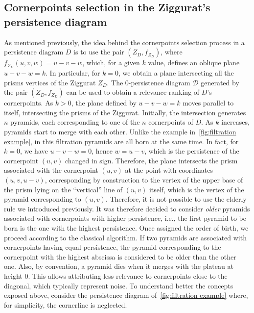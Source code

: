 \documentclass[english, LaM, oneside, noexaminfo]{sapthesis}
\begin{document}
\subsection{Cornerpoints selection in the Ziggurat's persistence diagram}\label{Ziggurat selection}


As mentioned previously, the idea behind the cornerpoints selection process in a persistence diagram $D$ is to use the pair $(Z_{D}, f_ {Z_D})$, where $f_{Z_D}(u, v, w) = u - v - w$, which, for a given $k$ value, defines an oblique plane $u - v - w = k$. In particular, for $k = 0$, we obtain a plane intersecting all the prisms vertices of the Ziggurat $Z_D$. The $0$-persistence diagram $\mathcal{D}$ generated by the pair $(Z_D, f_{Z_D})$ can be used to obtain a relevance ranking of $D$'s cornerpoints. As $k>0$, the plane defined by $u-v-w = k$ moves parallel to itself, intersecting the prisms of the Ziggurat. Initially, the intersection generates $n$ pyramids, each corresponding to one of the $n$ cornerpoints of $D$. As $k$ increases, pyramids start to merge with each other. Unlike the example in~\cref{fig:filtration example}, in this filtration pyramids are all born at the same time. In fact, for $k = 0$, we have $u - v - w = 0$, hence $w = u - v$, which is the persistence of the cornerpoint $(u, v)$ changed in sign. Therefore, the plane intersects the prism associated with the cornerpoint $(u, v)$ at the point with coordinates $(u, v, u-v)$, corresponding by construction to the vertex of the upper base of the prism lying on the ``vertical'' line of $(u, v)$ itself, which is the vertex of the pyramid corresponding to $(u, v)$. Therefore, it is not possible to use the elderly rule we introduced previously. It was therefore decided to consider \textit{older} pyramids associated with cornerpoints with higher persistence, i.e., the first pyramid to be born is the one with the highest persistence. Once assigned the order of birth, we proceed according to the classical algorithm. If two pyramids are associated with cornerpoints having equal persistence, the pyramid corresponding to the cornerpoint with the highest abscissa is considered to be older than the other one. Also, by convention, a pyramid dies when it merges with
the plateau at height $0$. This allows attributing less relevance to cornerpoints close to the diagonal, which typically represent noise. To understand better the concepts exposed above, consider the persistence diagram of~\cref{fig:filtration example} where, for simplicity, the cornerline is neglected.  
\end{document}
